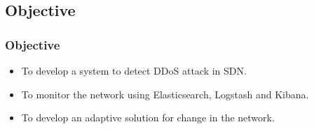 \documentclass[10pt]{beamer}
\begin{document}

\begin{frame}
\section[]{Objective}
\frametitle{Objective}
\begin{center}
\begin{itemize}
\footnotesize
\item
To develop a system to detect DDoS attack in SDN.
\item
To monitor the network using Elasticsearch, Logstash and Kibana.
\item
To develop an adaptive solution for change in the  network.
\end{itemize}
\end{center}
\end{frame}
\end{document}
